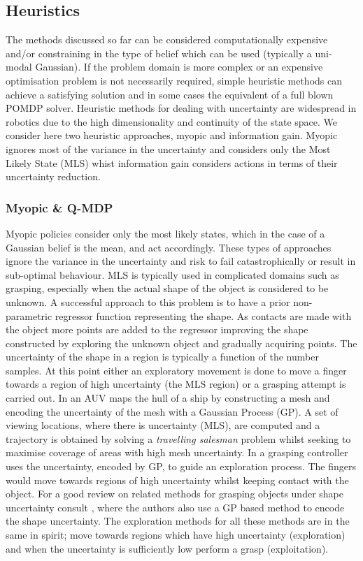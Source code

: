 \subsection{Heuristics}

The methods discussed so far can be considered computationally expensive and/or constraining in the type 
of belief which can be used (typically a uni-modal Gaussian). If the problem domain is more complex or 
an expensive optimisation problem is not necessarily required, simple heuristic methods can achieve a satisfying solution 
and in some cases the equivalent of a full blown POMDP solver. Heuristic methods for dealing with uncertainty are widespread in robotics
due to the high dimensionality and continuity of the state space. We consider here two heuristic approaches,
myopic and information gain. Myopic ignores most of the variance in the uncertainty and considers only the 
Most Likely State (MLS) whist information gain considers actions in terms of their uncertainty reduction.

\subsubsection{Myopic \& Q-MDP}

Myopic policies consider only the most likely states, which in the case of a Gaussian belief is the mean, and act accordingly. These types of approaches 
ignore the variance in the uncertainty and risk to fail catastrophically or result in sub-optimal behaviour. MLS is typically used in complicated domains such as grasping, especially when the actual 
shape of the object is considered to be unknown. A successful approach to this problem is to have a prior non-parametric regressor function representing the shape. 
As contacts are made with the object more points are added to the regressor improving the shape constructed by exploring the unknown object 
and gradually acquiring points. The uncertainty of the shape in a region is typically a function of the number samples. At this point either
an exploratory movement is done to move a finger towards a region of high uncertainty (the MLS region) or a grasping attempt is carried out. 
In \cite{un_water_inspection_icra_2012} an AUV maps the hull of a ship by constructing a mesh and encoding the uncertainty of the mesh with a Gaussian Process (GP). 
A set of viewing locations, where there is uncertainty (MLS), are computed and a trajectory is obtained by solving a \textit{travelling salesman} problem 
whilst seeking to maximise coverage of areas with high mesh uncertainty. In \cite{u_aware_grasp_ICRA_2015} a grasping controller uses the uncertainty, encoded by GP, to guide an exploration process. The fingers would move towards regions of high uncertainty whilst keeping contact with the object. For a good review on related methods for grasping objects under shape uncertainty consult \cite{Li_2015}, where the authors also use a GP based method to encode the shape uncertainty. 
The exploration methods for all these methods are in the same in spirit; move towards 
regions which have high uncertainty (exploration) and when the uncertainty is sufficiently low perform a grasp (exploitation).



